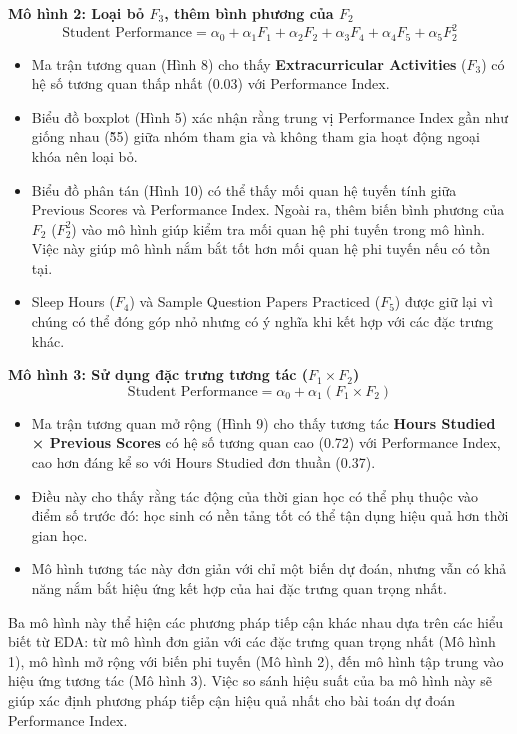 \textbf{Mô hình 2: Loại bỏ $F_3$, thêm bình phương của $F_2$}
$$ \text{Student Performance} = \alpha_{0} + \alpha_{1}F_{1} + \alpha_{2}F_{2} + \alpha_{3}F_{4} + \alpha_{4}F_{5} + \alpha_{5}F_{2}^2 $$

\begin{itemize}
	\item Ma trận tương quan (Hình 8) cho thấy \textbf{Extracurricular Activities} ($F_3$) có hệ số tương quan thấp nhất (0.03) với Performance Index.
	\item Biểu đồ boxplot (Hình 5) xác nhận rằng trung vị Performance Index gần như giống nhau (\~55) giữa nhóm tham gia và không tham gia hoạt động ngoại khóa nên loại bỏ.
	\item Biểu đồ phân tán (Hình 10) có thể thấy mối quan hệ tuyến tính giữa Previous Scores và Performance Index. Ngoài ra, thêm biến bình phương của $F_2$ ($F_2^2$) vào mô hình giúp kiểm tra mối quan hệ phi tuyến trong mô hình. Việc này giúp mô hình nắm bắt tốt hơn mối quan hệ phi tuyến nếu có tồn tại.
	\item Sleep Hours ($F_4$) và Sample Question Papers Practiced ($F_5$) được giữ lại vì chúng có thể đóng góp nhỏ nhưng có ý nghĩa khi kết hợp với các đặc trưng khác.
\end{itemize}

\textbf{Mô hình 3: Sử dụng đặc trưng tương tác ($F_1 \times F_2$)}
$$ \text{Student Performance} = \alpha_{0} + \alpha_{1}(F_{1} \times F_{2}) $$

\begin{itemize}
	\item Ma trận tương quan mở rộng (Hình 9) cho thấy tương tác \textbf{Hours Studied × Previous Scores} có hệ số tương quan cao (0.72) với Performance Index, cao hơn đáng kể so với Hours Studied đơn thuần (0.37).
	\item Điều này cho thấy rằng tác động của thời gian học có thể phụ thuộc vào điểm số trước đó: học sinh có nền tảng tốt có thể tận dụng hiệu quả hơn thời gian học.
	\item Mô hình tương tác này đơn giản với chỉ một biến dự đoán, nhưng vẫn có khả năng nắm bắt hiệu ứng kết hợp của hai đặc trưng quan trọng nhất.
\end{itemize}

Ba mô hình này thể hiện các phương pháp tiếp cận khác nhau dựa trên các hiểu biết từ EDA: từ mô hình đơn giản với các đặc trưng quan trọng nhất (Mô hình 1), mô hình mở rộng với biến phi tuyến (Mô hình 2), đến mô hình tập trung vào hiệu ứng tương tác (Mô hình 3). Việc so sánh hiệu suất của ba mô hình này sẽ giúp xác định phương pháp tiếp cận hiệu quả nhất cho bài toán dự đoán Performance Index.

